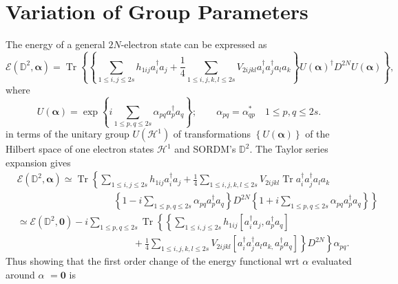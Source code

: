 \documentclass[aps,preprint]{revtex4}%
\begin{document}
\section{Variation of Group Parameters\label{VarGroupPar}}

The energy of a general $2N$-electron state can be expressed as
\begin{equation}
\mathcal{E}\left(  \mathbb{D}^{2},\mathbf{\alpha}\right)  =\operatorname{Tr}%
\left\{  \left\{  \sum_{1\leq i,j\leq2s}h_{1ij}a_{i}^{\dagger}a_{j}+\frac
{1}{4}\sum_{1\leq i,j,k,l\leq2s}V_{2ijkl}a_{i}^{\dagger}a_{j}^{\dagger}%
a_{l}a_{k}\right\}  U\left(  \mathbf{\alpha}\right)  ^{\dagger}D^{2N}U\left(
\mathbf{\alpha}\right)  \right\}  ,
\end{equation}
where
\begin{equation}
U\left(  \mathbf{\alpha}\right)  =\exp\left\{  i\sum_{1\leq p,q\leq2s}%
\alpha_{pq}a_{p}^{\dagger}a_{q}\right\}  ;\qquad\alpha_{pq}=\alpha_{qp}^{\ast
}\quad1\leq p,q\leq2s.
\end{equation}
in terms of the unitary group $U\left(  \mathcal{H}^{1}\right)  $ of
transformations $\left\{  U\left(  \mathbf{\alpha}\right)  \right\}  $ of the
Hilbert space of one electron states $\mathcal{H}^{1}$ and SORDM's
$\mathbb{D}^{2}$. The Taylor series expansion gives
\begin{align}
&  \mathcal{E}\left(  \mathbb{D}^{2},\mathbf{\alpha}\right)  \simeq
\operatorname{Tr}\left\{  \sum_{1\leq i,j\leq2s}h_{1ij}a_{i}^{\dagger}%
a_{j}+\frac{1}{4}\sum_{1\leq i,j,k,l\leq2s}V_{2ijkl}\operatorname{Tr}%
a_{i}^{\dagger}a_{j}^{\dagger}a_{l}a_{k}\right.  \nonumber\\
&  \qquad\qquad\qquad\qquad\qquad\left.  \left\{  1-i\sum_{1\leq p,q\leq
2s}\alpha_{pq}a_{p}^{\dagger}a_{q}\right\}  D^{2N}\left\{  1+i\sum_{1\leq
p,q\leq2s}\alpha_{pq}a_{p}^{\dagger}a_{q}\right\}  \right\}  \nonumber\\
&  \simeq\mathcal{E}\left(  \mathbb{D}^{2},\mathbf{0}\right)  -i\sum_{1\leq
p,q\leq2s}\operatorname{Tr}\left\{  \left\{  \sum_{1\leq i,j\leq2s}%
h_{1ij}\left[  a_{i}^{\dagger}a_{j},a_{p}^{\dagger}a_{q}\right]  \right.
\right.  \nonumber\\
&  \qquad\qquad\qquad\qquad\qquad\qquad+\left.  \left.  \frac{1}{4}\sum_{1\leq
i,j,k,l\leq2s}V_{2ijkl}\left[  a_{i}^{\dagger}a_{j}^{\dagger}a_{l}a_{k,}%
a_{p}^{\dagger}a_{q}\right]  \right\}  D^{2N}\right\}  \alpha_{pq}.
\end{align}
Thus showing that the first order change of the energy functional wrt
\textbf{$\alpha$} evaluated around \textbf{$\alpha$ }$=\mathbf{0}$ is
\end{document}
